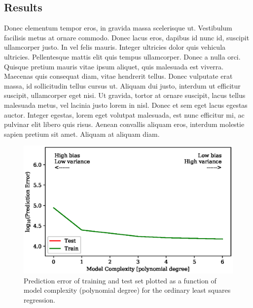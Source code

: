 \documentclass[a4paper, 10pt]{article}
\begin{document}
\begin{multicols}{2}
\section{Results}
Donec elementum tempor eros, in gravida massa scelerisque ut. Vestibulum facilisis metus at ornare commodo. Donec lacus eros, dapibus id nunc id, suscipit ullamcorper justo. In vel felis mauris. Integer ultricies dolor quis vehicula ultricies. Pellentesque mattis elit quis tempus ullamcorper. Donec a nulla orci. Quisque pretium mauris vitae ipsum aliquet, quis malesuada est viverra. Maecenas quis consequat diam, vitae hendrerit tellus. Donec vulputate erat massa, id sollicitudin tellus cursus ut. Aliquam dui justo, interdum ut efficitur suscipit, ullamcorper eget nisi. Ut gravida, tortor at ornare suscipit, lacus tellus malesuada metus, vel lacinia justo lorem in nisl. Donec et sem eget lacus egestas auctor. Integer egestas, lorem eget volutpat malesuada, est nunc efficitur mi, ac pulvinar elit libero quis risus. Aenean convallis aliquam eros, interdum molestie sapien pretium sit amet. Aliquam at aliquam diam.


\end{multicols}

\begin{figure}[H]
    \includegraphics[scale=1]{figs/biasvariancetradeoff.eps}
    \caption{Prediction error of training and test set plotted as a function of model complexity (polynomial degree) for the ordinary least squares regression.}
    \label{fig:my_label}
\end{figure}
    
\end{document}
